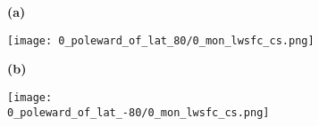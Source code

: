 \documentclass[preview]{standalone}
\begin{document}
\begin{figure}

  \begin{subfigure}[t]{0.05\textwidth}
    \textbf{\large{(a)}}
  \end{subfigure}
  \begin{subfigure}[t]{0.95\textwidth}
    \texttt{[image: 0\_poleward\_of\_lat\_80/0\_mon\_lwsfc\_cs.png]}
  \end{subfigure}

  \begin{subfigure}[t]{0.05\textwidth}
    \textbf{\large{(b)}}
  \end{subfigure}
  \begin{subfigure}[t]{0.95\textwidth}
    \texttt{[image: 0\_poleward\_of\_lat\_-80/0\_mon\_lwsfc\_cs.png]}
  \end{subfigure}

\end{figure}
\end{document}

